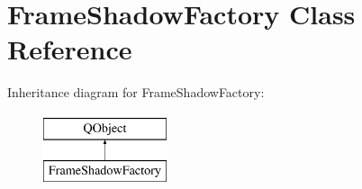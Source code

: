 \hypertarget{class_frame_shadow_factory}{}\section{Frame\+Shadow\+Factory Class Reference}
\label{class_frame_shadow_factory}
Inheritance diagram for Frame\+Shadow\+Factory\+:\begin{figure}[H]
\begin{center}
\leavevmode
\includegraphics[height=2.000000cm]{class_frame_shadow_factory}
\end{center}
\end{figure}
